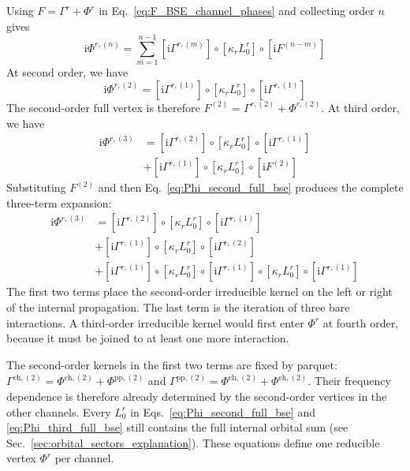\documentclass[aip,jcp,reprint,noshowkeys,superscriptaddress]{revtex4-1}
\newcommand{\ii}{\mathrm{i}}
\newcommand{\eh}{\text{eh}}
\newcommand{\teh}{\overline{\text{eh}}}
\newcommand{\pp}{\text{pp}}
\begin{document}
Using $F=\Gamma^r+\Phi^r$ in Eq.~\eqref{eq:F_BSE_channel_phases}
and collecting order $n$ gives
\begin{equation}
    \ii\Phi^{r,(n)}
    =\sum_{m=1}^{n-1}
    [\ii\Gamma^{r,(m)}]\circ[\kappa_r L_0^r]
    \circ[\ii F^{(n-m)}]
    \label{eq:Phi_order_recursion}
\end{equation}
At second order, we have
\begin{equation}
    \ii\Phi^{r,(2)}
    =[\ii\Gamma^{r,(1)}]\circ[\kappa_r L_0^r]
    \circ[\ii\Gamma^{r,(1)}]
    \label{eq:Phi_second_full_bse}
\end{equation}
The second-order full vertex is therefore
$F^{(2)}=\Gamma^{r,(2)}+\Phi^{r,(2)}$.
At third order, we have
\begin{equation}
\begin{split}
    \ii\Phi^{r,(3)}
    &=[\ii\Gamma^{r,(2)}]\circ[\kappa_r L_0^r]
    \circ[\ii\Gamma^{r,(1)}]
    \\
    &+[\ii\Gamma^{r,(1)}]\circ[\kappa_r L_0^r]
    \circ[\ii F^{(2)}]
    \label{eq:Phi_third_before_substitution}
\end{split}
\end{equation}
Substituting $F^{(2)}$ and then Eq.~\eqref{eq:Phi_second_full_bse}
produces the complete three-term expansion:
\begin{equation}
\begin{split}
    \ii\Phi^{r,(3)}
    &=[\ii\Gamma^{r,(2)}]\circ[\kappa_r L_0^r]
    \circ[\ii\Gamma^{r,(1)}]
    \\
    &+[\ii\Gamma^{r,(1)}]\circ[\kappa_r L_0^r]
    \circ[\ii\Gamma^{r,(2)}]
    \\
    &+[\ii\Gamma^{r,(1)}]\circ[\kappa_r L_0^r]
    \circ[\ii\Gamma^{r,(1)}]\circ[\kappa_r L_0^r]
    \circ[\ii\Gamma^{r,(1)}]
    \label{eq:Phi_third_full_bse}
\end{split}
\end{equation}
The first two terms place the second-order irreducible kernel on the left
or right of the internal propagation. The last term is the iteration of
three bare interactions. A third-order irreducible kernel would first
enter $\Phi^r$ at fourth order, because it must be joined to at least
one more interaction.

The second-order kernels in the first two terms are fixed by parquet:
$\Gamma^{\eh,(2)}=\Phi^{\teh,(2)}+\Phi^{\pp,(2)}$ and
$\Gamma^{\pp,(2)}=\Phi^{\eh,(2)}+\Phi^{\teh,(2)}$.
Their frequency dependence is therefore already determined by the
second-order vertices in the other channels.
Every $L_0^r$ in Eqs.~\eqref{eq:Phi_second_full_bse} and
\eqref{eq:Phi_third_full_bse} still contains the full internal orbital sum (see Sec.~\ref{sec:orbital_sectors_explanation}).
These equations define one reducible vertex $\Phi^r$ per channel.
\end{document}
